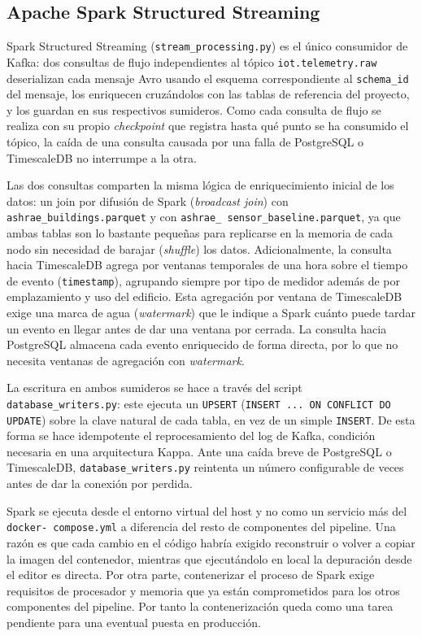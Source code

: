 \subsection{Apache Spark Structured Streaming}
\label{sec:spark-structured-streaming}

Spark Structured Streaming (\texttt{stream\_processing.py}) es el único consumidor de Kafka: dos consultas de flujo independientes al tópico \texttt{iot.telemetry.raw} deserializan cada mensaje Avro usando el esquema correspondiente al \texttt{schema\_id} del mensaje, los enriquecen cruzándolos con las tablas de referencia del proyecto, y los guardan en sus respectivos sumideros. Como cada consulta de flujo se realiza con su propio \textit{checkpoint} que registra hasta qué punto se ha consumido el tópico, la caída de una consulta causada por una falla de PostgreSQL o TimescaleDB no interrumpe a la otra.

Las dos consultas comparten la misma lógica de enriquecimiento inicial de los datos: un join por difusión de Spark (\textit{broadcast join}) con \texttt{ashrae\_buildings.parquet} y con \texttt{ashrae\_
sensor\_baseline.parquet}, ya que ambas tablas son lo bastante pequeñas para replicarse en la memoria de cada nodo sin necesidad de barajar (\textit{shuffle}) los datos. Adicionalmente, la consulta hacia TimescaleDB agrega por ventanas temporales de una hora sobre el tiempo de evento (\texttt{timestamp}), agrupando siempre por tipo de medidor además de por emplazamiento y uso del edificio. Esta agregación por ventana de TimescaleDB exige una marca de agua (\textit{watermark}) que le indique a Spark cuánto puede tardar un evento en llegar antes de dar una ventana por cerrada. La consulta hacia PostgreSQL almacena cada evento enriquecido de forma directa, por lo que no necesita ventanas de agregación con \textit{watermark}.

La escritura en ambos sumideros se hace a través del script \texttt{database\_writers.py}: este ejecuta un \texttt{UPSERT} (\texttt{INSERT ... ON CONFLICT DO UPDATE}) sobre la clave natural de cada tabla, en vez de un simple \texttt{INSERT}. De esta forma se hace idempotente el reprocesamiento del log de Kafka, condición necesaria en una arquitectura Kappa. Ante una caída breve de PostgreSQL o TimescaleDB, \texttt{database\_writers.py} reintenta un número configurable de veces antes de dar la conexión por perdida.

Spark se ejecuta desde el entorno virtual del host y no como un servicio más del \texttt{docker-
compose.yml} a diferencia del resto de componentes del pipeline. Una razón es que cada cambio en el código habría exigido reconstruir o volver a copiar la imagen del contenedor, mientras que ejecutándolo en local la depuración desde el editor es directa. Por otra parte, contenerizar el proceso de Spark exige requisitos de procesador y memoria que ya están comprometidos para los otros componentes del pipeline. Por tanto la contenerización queda como una tarea pendiente para una eventual puesta en producción.

